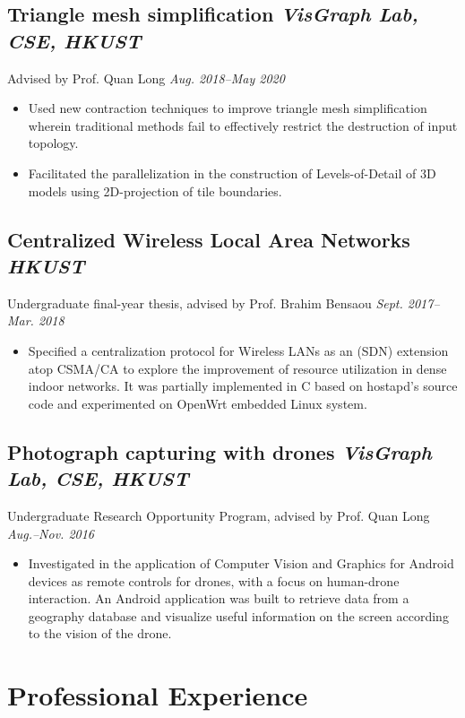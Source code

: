 \documentclass[11pt]{article}
\newcommand{\subsec}[2]{\subsection*{#1 \hfill {\normalfont\itshape #2}}}
\newcommand{\subsecdesc}[2]{{#1 \hfill \itshape #2}}
\begin{document}
  \subsec{Triangle mesh simplification}
         {VisGraph Lab, CSE, HKUST}
  \subsecdesc{Advised by Prof. Quan Long}
             {Aug. 2018--May 2020}
  \begin{itemize}
    \item Used new contraction techniques to improve triangle mesh
      simplification wherein traditional methods fail to effectively restrict
      the destruction of input topology.
    \item Facilitated the parallelization in the construction of
      Levels-of-Detail of 3D models using 2D-projection of tile boundaries.
  \end{itemize}

  \subsec{Centralized Wireless Local Area Networks}
         {HKUST}
  \subsecdesc{Undergraduate final-year thesis, advised by Prof. Brahim Bensaou}
             {Sept. 2017--Mar. 2018}
  \begin{itemize}
    \item Specified a centralization protocol for Wireless LANs as an
      (SDN) extension atop CSMA/CA to explore the
      improvement of resource utilization in dense indoor networks. It was
      partially implemented in C based on hostapd's source code and experimented
      on OpenWrt embedded Linux system.
  \end{itemize}

  \subsec{Photograph capturing with drones}
         {VisGraph Lab, CSE, HKUST}
  \subsecdesc{Undergraduate Research Opportunity Program, advised by Prof. Quan Long}
             {Aug.--Nov. 2016}
  \begin{itemize}
    \item Investigated in the application of Computer Vision and Graphics for
      Android devices as remote controls for drones, with a focus on human-drone
      interaction. An Android application was built to retrieve data from a
      geography database and visualize useful information on the screen
      according to the vision of the drone.
  \end{itemize}

\section*{Professional Experience} %
\end{document}
